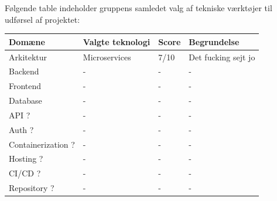 \documentclass[12pt,a4paper]{article}
\begin{document}
\newpage
Følgende table indeholder gruppens samledet valg af tekniske værktøjer til udførsel af projektet:\\
\begin{tabular}{|l|l|l|l|}
    \hline
    \rowcolor{gray!30}
    \textbf{Domæne} & \textbf{Valgte teknologi} & \textbf{Score} & \textbf{Begrundelse} \\
    \hline
    Arkitektur & Microservices & 7/10 & Det fucking sejt jo \\
    \hline
    Backend & - & - & - \\
    \hline
    Frontend & - & - & - \\
    \hline
    Database & - & - & - \\
    \hline
    API ? & - & - & - \\
    \hline
    Auth ? & - & - & - \\
    \hline
    Containerization ? & - & - & - \\
    \hline
    Hosting ? & - & - & - \\
    \hline
    CI/CD ? & - & - & - \\
    \hline
    Repository ? & - & - & - \\
    \hline
\end{tabular}

% 
% 
\end{document}
